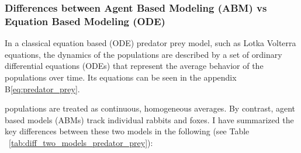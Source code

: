 \subsubsection{Differences between Agent Based Modeling (ABM) vs Equation Based Modeling  (ODE)}

In a classical equation based (ODE) predator prey model, such as Lotka Volterra equations, the dynamics of the populations are described by a set of ordinary differential equations (ODEs) that represent the average behavior of the populations over time. Its equations can be seen in the appendix B\ref{eq:predator_prey}.

populations are treated as continuous, homogeneous averages. By contrast, agent based models (ABMs) track individual rabbits and foxes.
I have summarized the key differences between these two models in the following (see Table ~\ref{tab:diff_two_models_predator_prey}):

